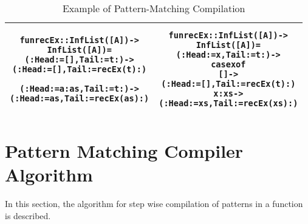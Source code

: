 \documentclass[11pt]{article}
\begin{document}
\begin{table}[h!]
\begin{center}
\begin{tabular}{|c|c|}
\begin{minipage}{2.6in}
\begin{alltt}
fun recEx::InfList([A]) -> 
           InfList([A]) =
  (: Head := [],Tail := t :) ->
    (: Head := [],Tail := recEx(t) :) 

  (: Head := a:as,Tail := t :) ->
    (: Head := as,Tail := recEx(as) :) 

\end{alltt}
\end {minipage} &
\begin{minipage}{3.2in}
\begin{alltt}



fun recEx::InfList([A]) -> 
           InfList([A]) =
  (: Head := x,Tail := t :) ->
    case x of 
      [] ->
        (: Head := [],Tail := recEx(t) :)
        x:xs ->
        (: Head := xs,Tail := recEx(xs) :) 


\end{alltt} 
\end {minipage}
\tabularnewline
\hline
\end{tabular}
\caption{Example of Pattern-Matching Compilation}
\label{Pmatch:Ex1}
\end{center}
\end{table}

\section {Pattern Matching Compiler Algorithm}
In this section, the algorithm for step wise compilation of patterns in a function is described.
\end{document}
